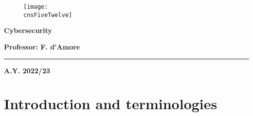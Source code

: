 \geometry{
	a4paper, %
	left=2cm, %
	right=2cm, %
	top=2.5cm, %
	bottom=2.5cm %
}




	
	\begin{center}
		\begin{figure}[h]
			\centering
			\texttt{[image: \\cnsFiveTwelve]}
		\end{figure}
		\vspace{1cm} 
		{\fontsize{28}{34}\selectfont \textbf{Cybersecurity}}
	\end{center}

	\vspace{1cm} 
	
	\begin{center}
	{\fontsize{22}{28}\selectfont \textbf{Professor: F. d'Amore}}
	\end{center}

	\vspace{1cm} 

	\textcolor{blue!60!black}{\rule{\linewidth}{2pt}}
	
	\vspace{10cm} 
	
	\begin{center}
	\textbf{A.Y. 2022/23}
	\end{center}

	\thispagestyle{empty}
	
	\newpage
	
	\myTOC

	\newpage
	\section{Introduction and terminologies}
	
	\newpage
